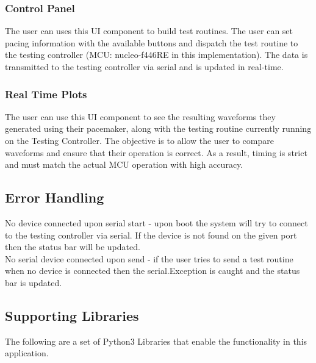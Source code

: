 \documentclass[11pt,fleqn]{book} %
\begin{document}
\subsubsection{Control Panel}

The user can uses this UI component to build test routines. The user can set pacing information with the available buttons and dispatch the test routine to the testing controller (MCU: nucleo-f446RE in this implementation). The data is transmitted to the testing controller via serial and is updated in real-time.

\subsubsection{Real Time Plots}

The user can use this UI component to see the resulting waveforms they generated using their pacemaker, along with the testing routine currently running on the Testing Controller. The objective is to allow the user to compare waveforms and ensure that their operation is correct. As a result, timing is strict and must match the actual MCU operation with high accuracy. 

\subsection{Error Handling}

No device connected upon serial start - upon boot the system will try to connect to the testing controller via serial. If the device is not found on the given port then the status bar will be updated.\\

No serial device connected upon send - if the user tries to send a test routine when no device is connected then the serial.Exception is caught and the status bar is updated.

\subsection{Supporting Libraries}

The following are a set of Python3 Libraries that enable the functionality in this application.
\end{document}
